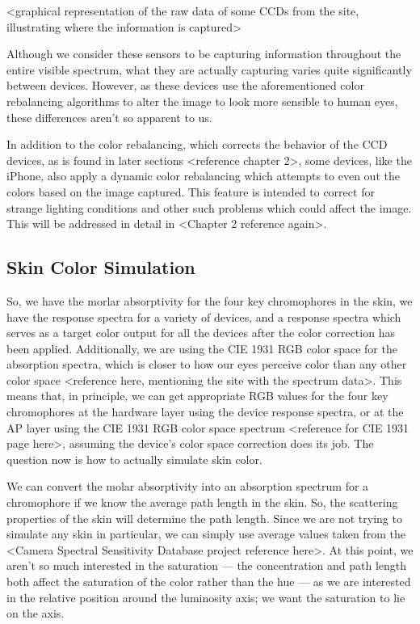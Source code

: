 <graphical representation of the raw data of some CCDs from the site, illustrating where the information is captured>

Although we consider these sensors to be capturing information throughout the entire visible spectrum, what they are actually capturing varies quite significantly between devices. However, as these devices use the aforementioned color rebalancing algorithms to alter the image to look more sensible to human eyes, these differences aren't so apparent to us.

In addition to the color rebalancing, which corrects the behavior of the CCD devices, as is found in later sections <reference chapter 2>, some devices, like the iPhone, also apply a dynamic color rebalancing which attempts to even out the colors based on the image captured. This feature is intended to correct for strange lighting conditions and other such problems which could affect the image. This will be addressed in detail in <Chapter 2 reference again>.


\subsection{Skin Color Simulation}

So, we have the morlar absorptivity for the four key chromophores in the skin, we have the response spectra for a variety of devices, and a response spectra which serves as a target color output for all the devices after the color correction has been applied. Additionally, we are using the CIE 1931 RGB color space for the absorption spectra, which is closer to how our eyes perceive color than any other color space <reference here, mentioning the site with the spectrum data>. This means that, in principle, we can get appropriate RGB values for the four key chromophores at the hardware layer using the device response spectra, or at the AP layer using the CIE 1931 RGB color space spectrum <reference for CIE 1931 page here>, assuming the device's color space correction does its job. The question now is how to actually simulate skin color.

We can convert the molar absorptivity into an absorption spectrum for a chromophore if we know the average path length in the skin. So, the scattering properties of the skin will determine the path length. Since we are not trying to simulate any skin in particular, we can simply use average values taken from the <Camera Spectral Sensitivity Database project reference here>. At this point, we aren't so much interested in the saturation --- the concentration and path length both affect the saturation of the color rather than the hue --- as we are interested in the relative position around the luminosity axis; we want the saturation to lie on the axis.

